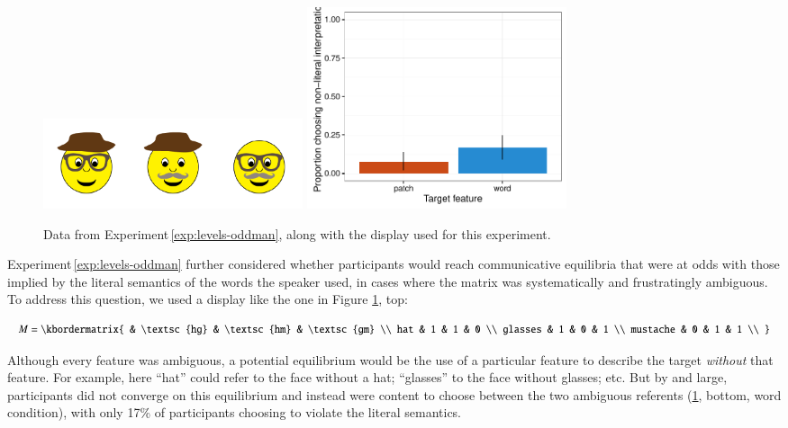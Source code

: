 \documentclass[man,noapacite]{apa2}
\newcounter{Experiment}
\newcommand{\exptref}[1]{Experiment\,\ref{#1}}
\begin{document}
 \begin{figure}[t]
  \centering
  \includegraphics[width=3in]{figures/levels-oddman-stim.pdf}
  \includegraphics[width=3in]{../plots/3-levels-oddman.pdf}

  \caption{\label{fig:levels-oddman} Data from \exptref{exp:levels-oddman}, along with the display used for this experiment.}
\end{figure}

\exptref{exp:levels-oddman} further considered whether participants would reach communicative equilibria that were at odds with those implied by the literal semantics of the words the speaker used, in cases where the matrix was systematically and frustratingly ambiguous. To address this question, we used a display like the one in Figure \ref{fig:levels-oddman}, top:

\begin{equation}
    M = \kbordermatrix{
               & \textsc{hg} & \textsc{hm} & \textsc{gm} \\
      hat      & 1  & 1  & 0  \\
      glasses  & 1  & 0  & 1 \\
      mustache & 0  & 1  & 1 \\
    }
\end{equation}

\noindent Although every feature was ambiguous, a potential equilibrium would be the use of a particular feature to describe the target \emph{without} that feature. For example, here ``hat'' could refer to the face without a hat; ``glasses'' to the face without glasses; etc. But by and large, participants did not converge on this equilibrium and instead were content to choose between the two ambiguous referents (\ref{fig:levels-oddman}, bottom, word condition), with only 17\% of participants choosing to violate the literal semantics.
\end{document}
